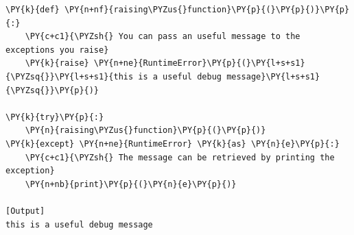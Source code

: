 \begin{Verbatim}[label=\makebox{\url{https://github.com/lucabaldini/cmepda/tree/master/slides/latex/snippets/raising.py}},commandchars=\\\{\}]
\PY{k}{def} \PY{n+nf}{raising\PYZus{}function}\PY{p}{(}\PY{p}{)}\PY{p}{:}
    \PY{c+c1}{\PYZsh{} You can pass an useful message to the exceptions you raise}
    \PY{k}{raise} \PY{n+ne}{RuntimeError}\PY{p}{(}\PY{l+s+s1}{\PYZsq{}}\PY{l+s+s1}{this is a useful debug message}\PY{l+s+s1}{\PYZsq{}}\PY{p}{)} 

\PY{k}{try}\PY{p}{:}
    \PY{n}{raising\PYZus{}function}\PY{p}{(}\PY{p}{)}
\PY{k}{except} \PY{n+ne}{RuntimeError} \PY{k}{as} \PY{n}{e}\PY{p}{:}
    \PY{c+c1}{\PYZsh{} The message can be retrieved by printing the exception}
    \PY{n+nb}{print}\PY{p}{(}\PY{n}{e}\PY{p}{)}

[Output]
this is a useful debug message
\end{Verbatim}
